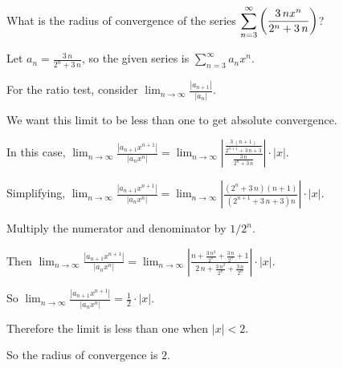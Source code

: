 \documentclass{ximera}
\begin{document}
\begin{question}
  What is the radius of convergence of the series \(\displaystyle\displaystyle\sum_{n=3}^\infty \left( \displaystyle\frac{3 \, n x^{n}}{2^{n} + 3 \, n} \right)\)?
  
  \begin{solution}
    \begin{hint}
      Let \(a_{n} = \displaystyle\frac{3 \, n}{2^{n} + 3 \, n}\), so the given series is \(\displaystyle\sum_{n=3}^\infty a_{n} x^{n}\).
    \end{hint}
    \begin{hint}
      For the ratio test, consider \(\lim_{n \to \infty} \displaystyle\frac{|a_{n+1}|}{|a_{n}|}\).
    \end{hint}
    \begin{hint}
      We want this limit to be less than one to get absolute convergence.
    \end{hint}
    \begin{hint}
      In this case, \(\lim_{n \to \infty} \displaystyle\frac{|a_{n+1} x^{n+1}|}{|a_{n} x^{n}|} = \lim_{n \to \infty} \left| \displaystyle\frac{\displaystyle\frac{3 \, {\left(n + 1\right)}}{2^{n + 1} + 3 \, n + 3}}{\displaystyle\frac{3 \, n}{2^{n} + 3 \, n}} \right| \cdot \left| x \right|\).
    \end{hint}
    \begin{hint}
      Simplifying, \(\lim_{n \to \infty} \displaystyle\frac{|a_{n+1} x^{n+1}|}{|a_{n} x^{n}|} = \lim_{n \to \infty} \left| \displaystyle\frac{{\left(2^{n} + 3 \, n\right)} {\left(n + 1\right)}}{{\left(2^{n + 1} + 3 \, n + 3\right)} n} \right| \cdot \left| x \right|\).
    \end{hint}
    \begin{hint}
      Multiply the numerator and denominator by \(1/2^n\).
    \end{hint}
    \begin{hint}
      Then \(\lim_{n \to \infty} \displaystyle\frac{|a_{n+1} x^{n+1}|}{|a_{n} x^{n}|} = \lim_{n \to \infty} \left| 
        \displaystyle\frac{n + \displaystyle\frac{3 \, n^{2}}{2^{n}} + \displaystyle\frac{3 \, n}{2^{n}} + 1}{2 \, n + \displaystyle\frac{3 \, n^{2}}{2^{n}} + \displaystyle\frac{3 \, n}{2^{n}}} \right| \cdot \left| x \right|\).
    \end{hint}
    \begin{hint}
      So \(\lim_{n \to \infty} \displaystyle\frac{|a_{n+1} x^{n+1}|}{|a_{n} x^{n}|} = \displaystyle\frac{1}{2} \cdot \left| x \right|\).
    \end{hint}
    \begin{hint}
      Therefore the limit is less than one when \(\left| x \right| < 2\).
    \end{hint}
    \begin{hint}
      So the radius of convergence is \(2\).
    \end{hint}


\end{solution}
\end{question}
\end{document}
